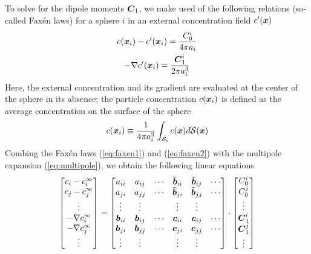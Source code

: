 \begin{appendices}
To solve for the dipole moments $\boldsymbol{C}_1$, we make used of the following relations (so-called Fax\'en laws\autocite{Bonnecaze1990,OBrien1979}) for a sphere $i$ in an external concentration field $c'(\boldsymbol{x})$ 
\begin{gather}
    c(\boldsymbol{x}_i) - c'(\boldsymbol{x}_i) = \frac{C_0^i}{4\pi a_i}  \label{eq:faxen1}
    \\
    -\nabla c'(\boldsymbol{x}_i) = \frac{\boldsymbol{C}_1^i}{2\pi a_i^3}  \label{eq:faxen2}
\end{gather}
Here, the external concentration and its gradient are evaluated at the center of the sphere in its absence; the particle concentration $c(\boldsymbol{x}_i)$ is defined as the average concentration on the surface of the sphere
\begin{equation}
    c(\boldsymbol{x}_i) \equiv \frac{1}{4\pi a_i^2} \int_{\mathcal{S}_i} c(\boldsymbol{x}) d\mathcal{S}(\boldsymbol{x}) 
\end{equation}
Combing the Fax\'en laws (\ref{eq:faxen1}) and (\ref{eq:faxen2}) with the multipole expansion (\ref{eq:multipole}), we obtain the following linear equations
\begin{equation}
    \begin{bmatrix} c_i-c^{\infty}_i \\ c_j-c^{\infty}_j \\ \vdots \\ -\nabla c^{\infty}_i \\ -\nabla c^{\infty}_j \\ \vdots \end{bmatrix} = 
    \begin{bmatrix} 
        a_{ii} & a_{ij} & \cdots &\ve{\tilde{b}}_{ii} & \ve{\tilde{b}}_{ij} & \cdots \\
        a_{ji} & a_{jj} & \cdots & \ve{\tilde{b}}_{ji} & \ve{\tilde{b}}_{jj} & \cdots \\
        \vdots & \vdots & & \vdots & \vdots &  \\
        \ve{b}_{ii} & \ve{b}_{ij} & \cdots & \ve{c}_{ii} & \ve{c}_{ij} & \cdots \\
        \ve{b}_{ji} & \ve{b}_{jj} & \cdots & \ve{c}_{ji} & \ve{c}_{jj} & \cdots \\
        \vdots & \vdots & & \vdots & \vdots &  \\
    \end{bmatrix}
    \cdot
    \begin{bmatrix} C^i_0 \\ C^j_0 \\ \vdots \\ \ve{C}^i_1 \\ \ve{C}^j_1 \\ \vdots \end{bmatrix} \label{eq:grandPotential}

\end{equation}
\end{appendices}
